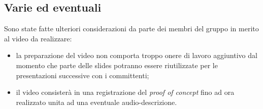 	\subsection*{Varie ed eventuali}
		Sono state fatte ulteriori considerazioni da parte dei membri del gruppo in merito al video da realizzare:
		\begin{itemize}
			\item la preparazione del video non comporta troppo onere di lavoro aggiuntivo dal momento che parte delle slides potranno essere riutilizzate per le presentazioni successive con i committenti;
			\item il video consisterà in una registrazione del \textit{proof of concept} fino ad ora realizzato unita ad una eventuale audio-descrizione. 
		\end{itemize}